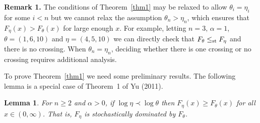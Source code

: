 \documentclass[11pt]{article}
\newtheorem{lemma}{\bf Lemma}
\begin{document}
{\bf Remark 1.} The conditions of Theorem~\ref{thm1} may be relaxed to allow $\theta_i= \eta_i$ for some $i<n$ but we cannot relax the assumption $\theta_n > \eta_n$, which ensures that $F_\eta(x) > F_\theta(x)$ for large enough $x$.  For example, letting $n=3,\, \alpha=1$, $\theta=(1, 6, 10)$ and $\eta = (4, 5, 10)$ we can directly check that $F_\theta\leq_{\rm st} F_\eta$ and there is no crossing.  When $\theta_n = \eta_n$, deciding whether there is one crossing or no crossing requires additional analysis. 

To prove Theorem~\ref{thm1} we need some preliminary results.  The following lemma is a special case of Theorem~1 of Yu (2011). 
\begin{lemma}
\label{lem1}
For $n \geq 2$ and $\alpha >0$, if $\log \eta \prec \log \theta$ then $F_\eta(x)\geq F_\theta(x)$ for all $x\in (0, \infty)$.  That is, $F_\eta$ is stochastically dominated by $F_\theta$. 
\end{lemma}
\end{document}
